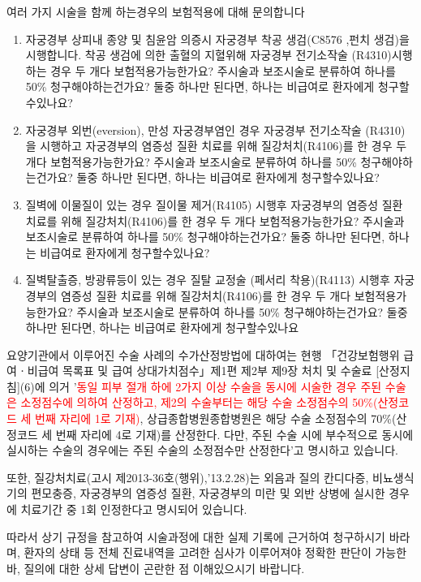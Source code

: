 \medskip
\begin{commentbox}{여러 가지 시술을 함께 하는경우의 보험적용에 대해 문의합니다}
\begin{enumerate}\tightlist
\item 자궁경부 상피내 종양 및 침윤암 의증시 자궁경부 착공 생검(C8576 ,펀치 생검)을 시행합니다. 착공 생검에 의한 출혈의 지혈위해 자궁경부 전기소작술 (R4310)시행하는 경우 두 개다 보험적용가능한가요? 주시술과 보조시술로 분류하여 하나를 50\% 청구해야하는건가요? 둘중 하나만 된다면, 하나는 비급여로 환자에게 청구할수있나요?
\item 자궁경부 외번(eversion), 만성 자궁경부염인 경우 자궁경부 전기소작술 (R4310)을 시행하고 자궁경부의 염증성 질환 치료를 위해 질강처치(R4106)를 한 경우 두 개다 보험적용가능한가요? 주시술과 보조시술로 분류하여 하나를 50\% 청구해야하는건가요? 둘중 하나만 된다면, 하나는 비급여로 환자에게 청구할수있나요?
\item 질벽에 이물질이 있는 경우 질이물 제거(R4105) 시행후 자궁경부의 염증성 질환 치료를 위해 질강처치(R4106)를 한 경우 두 개다 보험적용가능한가요? 주시술과 보조시술로 분류하여 하나를 50\% 청구해야하는건가요? 둘중 하나만 된다면, 하나는 비급여로 환자에게 청구할수있나요? 
\item 질벽탈출증, 방광류등이 있는 경우 질탈 교정술 (페서리 착용)(R4113) 시행후 자궁경부의 염증성 질환 치료를 위해 질강처치(R4106)를 한 경우 두 개다 보험적용가능한가요? 주시술과 보조시술로 분류하여 하나를 50\% 청구해야하는건가요? 둘중 하나만 된다면, 하나는 비급여로 환자에게 청구할수있나요
\end{enumerate}
요양기관에서 이루어진 수술 사례의 수가산정방법에 대하여는 현행 「건강보험행위 급여ㆍ비급여 목록표 및 급여 상대가치점수」제1편 제2부 제9장 처치 및 수술료 [산정지침](6)에 의거 '\textcolor{red}{동일 피부 절개 하에 2가지 이상 수술을 동시에 시술한 경우 주된 수술은 소정점수에 의하여 산정하고, 제2의 수술부터는 해당 수술 소정점수의 50\%(산정코드 세 번째 자리에 1로 기재)}, 상급종합병원\bullet 종합병원은 해당 수술 소정점수의 70\%(산정코드 세 번째 자리에 4로 기재)를 산정한다. 다만, 주된 수술 시에 부수적으로 동시에 실시하는 수술의 경우에는 주된 수술의 소정점수만 산정한다'고 명시하고 있습니다.\par 또한, 질강처치료(고시 제2013-36호(행위),'13.2.28)는 외음과 질의 칸디다증, 비뇨생식기의 편모충증, 자궁경부의 염증성 질환, 자궁경부의 미란 및 외반 상병에 실시한 경우에 치료기간 중 1회 인정한다고 명시되어 있습니다.
\par 따라서 상기 규정을 참고하여 시술과정에 대한 실제 기록에 근거하여 청구하시기 바라며, 환자의 상태 등 전체 진료내역을 고려한 심사가 이루어져야 정확한 판단이 가능한 바, 질의에 대한 상세 답변이 곤란한 점 이해있으시기 바랍니다. 
\end{commentbox}